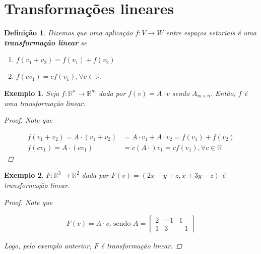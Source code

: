 \documentclass{article}
\newtheorem*{definition}{Definição}
\newtheorem*{example}{Exemplo}
\begin{document}
\section{Transformações lineares}
\begin{definition}
	Dizemos que uma aplicação $f:V\to W$ entre espaços vetoriais é uma \textbf{transformação linear} se
	
	\begin{enumerate}
		\item $f(v_1 + v_2) = f(v_1) + f(v_2)$
		\item $f(cv_1) = cf(v_1), \forall c\in\mathbb{R}$. 
	\end{enumerate}
\end{definition}

\begin{example}
	Seja $f:\mathbb{R}^n\to\mathbb{R}^m$ dada por $f(v) = A\cdot v$ sendo $A_{m\times n}$. Então, $f$ é uma transformação linear.
	
	\begin{proof}
		Note que
		
		\begin{align*}
		f(v_1 + v_2) = A\cdot (v_1 + v_2) &= A\cdot v_1 + A\cdot v_2 = f(v_1) + f(v_2) \\
		f(cv_1) = A\cdot(cv_1) &= c(A\cdot)v_1 = cf(v_1), \forall c\in\mathbb{R}
		\end{align*}
		
	\end{proof}
	
\end{example}

\begin{example}
	$F:\mathbb{R}^3\to\mathbb{R}^2$ dada por $F(v) = (2x-y+z, x+3y - z)$ é transformação linear.
	
	\begin{proof}
		Note que
		
		\begin{align*}
		F(v) = A\cdot v\text{, sendo } A = \begin{bmatrix}
		2 & -1 & 1 \\
		1 & 3 & -1
		\end{bmatrix}
		\end{align*}
		
		\par\vspace{0.3cm} Logo, pelo exemplo anterior, $F$ é transformação linear.
		
	\end{proof}
	
\end{example}
\end{document}
